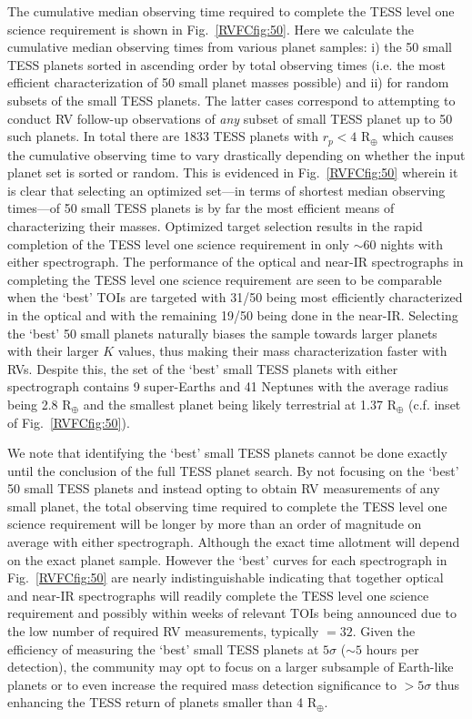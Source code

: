 The cumulative median observing time required to complete the TESS level one science requirement is shown
in Fig.~\ref{RVFCfig:50}. Here we calculate the cumulative median observing times from various planet samples:
i) the 50 small TESS planets sorted in ascending order by total observing times
(i.e. the most efficient characterization of 50 small planet masses possible) and ii)
for random subsets of the small TESS planets.
The latter cases correspond to attempting to conduct RV follow-up observations of
\emph{any} subset of small TESS planet up to 50 such planets. In total there are 1833 TESS planets with
$r_p < 4$ R$_{\oplus}$ which causes the cumulative observing time to vary drastically depending on
whether the input planet set is sorted or random. This is evidenced in Fig.~\ref{RVFCfig:50} wherein it is
clear that selecting an optimized set---in terms of shortest median observing times---of 50 small TESS planets
is by far the most efficient means of characterizing their masses. Optimized target selection results in the
rapid completion of the TESS level one science requirement in only $\sim 60$ nights with either spectrograph.
The performance of the optical and near-IR spectrographs in completing the TESS level one science
requirement are seen to be comparable when the `best' TOIs are targeted with 31/50 being most efficiently
characterized in the optical and with the remaining 19/50 being done in the near-IR. Selecting
the `best' 50 small planets naturally biases the sample towards larger planets with their larger $K$ values, 
thus making their mass characterization faster with RVs. Despite this, the set of the `best' small TESS planets
with either spectrograph contains 9 super-Earths and 41 Neptunes with the average radius being 2.8 R$_{\oplus}$
and the smallest planet being likely terrestrial at 1.37 R$_{\oplus}$ (c.f. inset of Fig.~\ref{RVFCfig:50}).

We note that identifying the `best' small TESS planets cannot be done exactly
until the conclusion of the full TESS planet search. By not focusing on the `best' 50 small
TESS planets and instead opting to obtain RV measurements of any small planet, the total observing time
required to complete the TESS level one science requirement will be longer by more than an order of magnitude
on average with either spectrograph. Although the exact time allotment will depend on the exact
planet sample. However the `best' curves for each spectrograph in Fig.~\ref{RVFCfig:50} are nearly
indistinguishable indicating that together optical and near-IR spectrographs will readily complete the TESS
level one science requirement and possibly within weeks of relevant TOIs being announced due to the low number
of required RV measurements, typically \nrv{}$=32$.
Given the efficiency of measuring the `best' small TESS planets at $5\sigma$ ($\sim 5$ hours per
detection), the community may opt to focus on a larger subsample of Earth-like planets or to even increase the
required mass detection significance to $> 5\sigma$ thus enhancing the TESS return of planets smaller than
4 R$_{\oplus}$.


